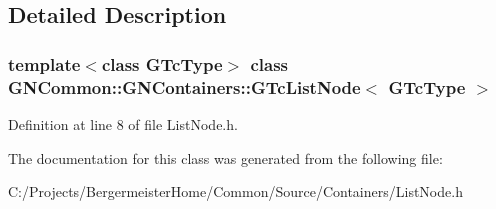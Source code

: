 \subsection{Detailed Description}
\subsubsection*{template$<$class G\+Tc\+Type$>$\newline
class G\+N\+Common\+::\+G\+N\+Containers\+::\+G\+Tc\+List\+Node$<$ G\+Tc\+Type $>$}



Definition at line 8 of file List\+Node.\+h.



The documentation for this class was generated from the following file\+:\begin{DoxyCompactItemize}
\item 
C\+:/\+Projects/\+Bergermeister\+Home/\+Common/\+Source/\+Containers/List\+Node.\+h\end{DoxyCompactItemize}
